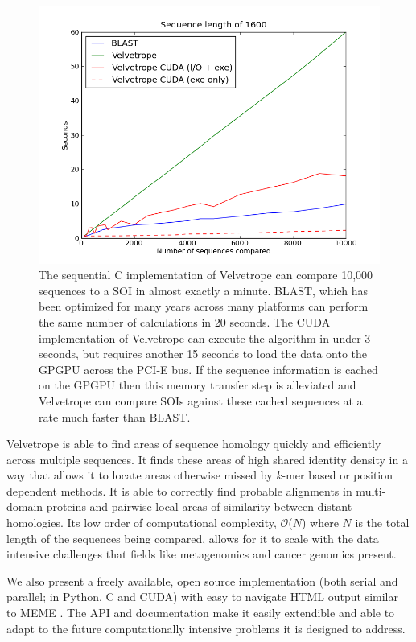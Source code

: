 \documentclass[phd,tocprelim]{cornell}
\begin{document}
\begin{figure}[htp]%
 \centerline{\includegraphics[width=\textwidth]{figures/velvetrope/timersSC.png}}
 \caption[Velvetrope timings]{The sequential C implementation of Velvetrope can compare 10,000 sequences to a SOI in almost exactly a minute. BLAST, which has been optimized for many years across many platforms can perform the same number of calculations in 20 seconds. The CUDA implementation of Velvetrope can execute the algorithm in under 3 seconds, but requires another 15 seconds to load the data onto the GPGPU across the PCI-E bus. If the sequence information is cached on the GPGPU then this memory transfer step is alleviated and Velvetrope can compare SOIs against these cached sequences at a rate much faster than BLAST.}
 	\label{fig:vr06}
 \end{figure}

Velvetrope is able to find areas of sequence homology quickly and efficiently across multiple sequences. It finds these areas of high shared identity density in a way that allows it to locate areas otherwise missed by $k$-mer based or position dependent methods. It is able to correctly find probable alignments in multi-domain proteins and pairwise local areas of similarity between distant homologies. Its low order of computational complexity, $\mathcal O$($N$) where $N$ is the total length of the sequences
being compared, allows for it to scale with the data intensive challenges that fields like metagenomics and cancer genomics present.

We also present a freely available, open source implementation (both serial and parallel; in Python, C and CUDA) with easy to navigate HTML output similar to MEME \cite{MEME}. The API and documentation make it easily extendible and able to adapt to the future computationally intensive problems it is designed to address.
\end{document}
